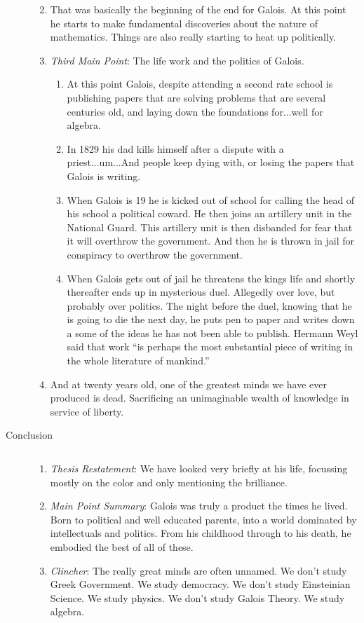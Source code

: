 \documentclass[letterpaper]{article}
\begin{document}
\begin{description}
\begin{enumerate}
  \renewcommand{\labelenumi}{\emph{Transition}:}
  \item
  That was basically the beginning of the end for Galois. At this point he starts to make fundamental discoveries about the nature of mathematics. Things are also really starting to heat up politically.
  \renewcommand{\labelenumi}{\Roman{enumi}}
  \setcounter{enumi}{2}
  \item
  \emph{Third Main Point}: The life work and the politics of Galois.
  \begin{enumerate}
    \item
    At this point Galois, despite attending a second rate school is publishing papers that are solving problems that are several centuries old, and laying down the foundations for...well for algebra.
    \item
    In 1829 his dad kills himself after a dispute with a priest...um...And people keep dying with, or losing the papers that Galois is writing.
    \item
    When Galois is 19 he is kicked out of school for calling the head of his school a political coward. He then joins an artillery unit in the National Guard. This artillery unit is then disbanded for fear that it will overthrow the government. And then he is thrown in jail for conspiracy to overthrow the government.
    \item
    When Galois gets out of jail he threatens the kings life and shortly thereafter ends up in mysterious duel. Allegedly over love, but probably over politics. The night before the duel, knowing that he is going to die the next day, he puts pen to paper and writes down a some of the ideas he has not been able to publish. Hermann Weyl said that work ``is perhaps the most substantial piece of writing in the whole literature of mankind.''\cite{abstract}
  \end{enumerate}
  \renewcommand{\labelenumi}{\emph{Transition}:}
  \item
  And at twenty years old, one of the greatest minds we have ever produced is dead. Sacrificing an unimaginable wealth of knowledge in service of liberty.
  \renewcommand{\labelenumi}{\Roman{enumi}}
\end{enumerate}
\item[Conclusion]$\quad$
\begin{enumerate}
  \item
  \emph{Thesis Restatement}:
  We have looked very briefly at his life, focussing mostly on the color and only mentioning the brilliance.
  \item
  \emph{Main Point Summary}:
  Galois was truly a product the times he lived. Born to political and well educated parents, into a world dominated by intellectuals and politics. From his childhood through to his death, he embodied the best of all of these.
  \item
  \emph{Clincher}:
  The really great minds are often unnamed. We don't study Greek Government. We study democracy. We don't study Einsteinian Science. We study physics. We don't study Galois Theory. We study algebra.


\end{enumerate}
\end{description}
\end{document}
